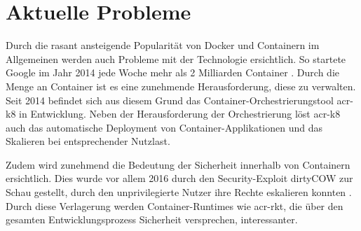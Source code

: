 \section{Aktuelle Probleme}
\label{sec:aktuell}
Durch die rasant ansteigende Popularität von Docker und Containern im Allgemeinen werden auch Probleme mit der Technologie ersichtlich. So startete Google im Jahr 2014 jede Woche mehr als 2 Milliarden Container \citep{ContainersatScale}. Durch die Menge an Container ist es eine zunehmende Herausforderung, diese zu verwalten. Seit 2014 befindet sich aus diesem Grund das Container-Orchestrierungstool \gls{acr-k8} in Entwicklung. Neben der Herausforderung der Orchestrierung löst \gls{acr-k8} auch das automatische Deployment von Container-Applikationen und das Skalieren bei entsprechender Nutzlast.

Zudem wird zunehmend die Bedeutung der Sicherheit innerhalb von Containern ersichtlich. Dies wurde vor allem 2016 durch den Security-Exploit dirtyCOW zur Schau gestellt, durch den unprivilegierte Nutzer ihre Rechte eskalieren konnten \citep{DirtyCOWCVE20165195}. Durch diese Verlagerung werden Container-Runtimes wie \gls{acr-rkt}, die über den gesamten Entwicklungsprozess Sicherheit versprechen, interessanter. 

